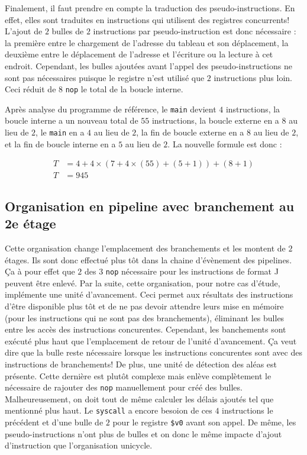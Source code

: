 \documentclass[a11paper]{article}
\begin{document}
Finalement, il faut prendre en compte la traduction des pseudo-instructions.
En effet, elles sont traduites en instructions qui utilisent des registres
concurrents! L'ajout de $2$ bulles de $2$ instructions par pseudo-instruction
est donc nécessaire : la première entre le chargement de l'adresse du tableau
et son déplacement, la deuxième entre le déplacement de l'adresse et
l'écriture ou la lecture à cet endroit. Cependant, les bulles ajoutées avant
l'appel des pseudo-instructions ne sont pas nécessaires puisque le registre
n'est utilisé que $2$ instructions plus loin. Ceci réduit de $8$ \verb|nop|
le total de la boucle interne.

Après analyse du programme de référence, le \verb|main| devient $4$
instructions, la boucle interne a un nouveau total de $55$ instructions, la
boucle externe en a $8$ au lieu de $2$, le \verb|main| en a $4$ au lieu de $2$,
la fin de boucle externe en a $8$ au lieu de $2$, et la fin de boucle interne
en a $5$ au lieu de $2$. La nouvelle formule est donc :

\begin{align}
  T &= 4+ 4\times(7+4\times(55)+(5+1)) + (8+1) \\
  T &= 945
\end{align}

\subsection{Organisation en pipeline avec branchement au 2e étage}

Cette organisation change l'emplacement des branchements et les montent de
$2$ étages. Ils sont donc effectué plus tôt dans la chaine d'évènement des
pipelines. Ça à pour effet que $2$ des $3$ \verb|nop| nécessaire pour les
instructions de format J peuvent être enlevé. Par la suite, cette
organisation, pour notre cas d'étude, implémente une unité d'avancement. Ceci
permet aux résultats des instructions d'être disponible plus tôt et de ne pas
devoir attendre leurs mise en mémoire (pour les instructions qui ne sont pas
des branchements), éliminant les bulles entre les accès des instructions
concurentes. Cependant, les banchements sont exécuté plus haut que
l'emplacement de retour de l'unité d'avancement. Ça veut dire que la bulle
reste nécessaire lorsque les instructions concurentes sont avec des
instructions de branchements! De plus, une unité de détection des aléas est
présente. Cette dernière est plutôt complexe mais enlève complètement le
nécessaire de rajouter des \verb|nop| manuellement pour créé des bulles.
Malheureusement, on doit tout de même calculer les délais ajoutés tel que
mentionné plus haut. Le \verb|syscall| a encore besoion de ces $4$
instructions le précédent et d'une bulle de $2$ pour le registre \verb|$v0|
avant son appel. De même, les pseudo-instructions n'ont plus de bulles et on
donc le même impacte d'ajout d'instruction que l'organisation unicycle.
\end{document}
